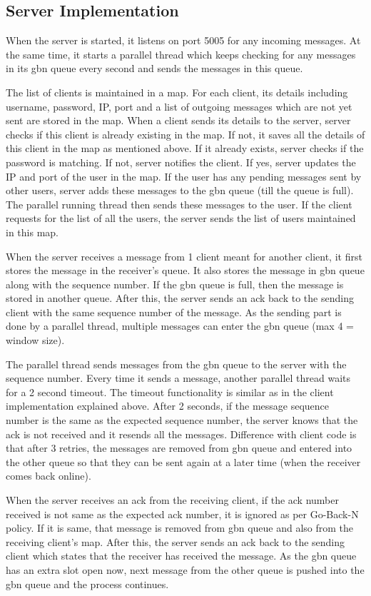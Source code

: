 \documentclass[10pt, pdftex, twocolumn]{report}
\begin{document}
	
	\subsection*{Server Implementation}
	When the server is started, it listens on port 5005 for any incoming messages. At the same time, it starts a parallel thread which keeps checking for any messages in its gbn queue every second and sends the messages in this queue. 
	
	The list of clients is maintained in a map. For each client, its details including username, password, IP, port and a list of outgoing messages which are not yet sent are stored in the map. When a client sends its details to the server, server checks if this client is already existing in the map. If not, it saves all the details of this client in the map as mentioned above. If it already exists, server checks if the password is matching. If not, server notifies the client. If yes, server updates the IP and port of the user in the map. If the user has any pending messages sent by other users, server adds these messages to the gbn queue (till the queue is full). The parallel running thread then sends these messages to the user. If the client requests for the list of all the users, the server sends the list of users maintained in this map.
	
	When the server receives a message from 1 client meant for another client, it first stores the message in the receiver’s queue. It also stores the message in gbn queue along with the sequence number. If the gbn queue is full, then the message is stored in another queue. After this, the server sends an ack back to the sending client with the same sequence number of the message. As the sending part is done by a parallel thread, multiple messages can enter the gbn queue (max 4 = window size). 
	
	The parallel thread sends messages from the gbn queue to the server with the sequence number. Every time it sends a message, another parallel thread waits for a 2 second timeout. The timeout functionality is similar as in the client implementation explained above. After 2 seconds, if the message sequence number is the same as the expected sequence number, the server knows that the ack is not received and it resends all the messages. Difference with client code is that after 3 retries, the messages are removed from gbn queue and entered into the other queue so that they can be sent again at a later time (when the receiver comes back online).
	
	When the server receives an ack from the receiving client, if the ack number received is not same as the expected ack number, it is ignored as per Go-Back-N policy. If it is same, that message is removed from gbn queue and also from the receiving client’s map. After this, the server sends an ack back to the sending client which states that the receiver has received the message. As the gbn queue has an extra slot open now, next message from the other queue is pushed into the gbn queue and the process continues.
	
\end{document}
